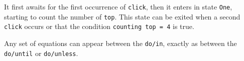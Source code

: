 \documentclass[11pt,titlepage,twoside]{report}
\begin{document}
It first awaits for the first occurrence of \verb-click-, then it
enters in state \verb-One-, starting to count the number of
\verb-top-. This state can be exited when a second
\verb-click- occurs or that the condition \verb-counting top = 4- is
true. 

Any set of equations can appear between the \texttt{do/in}, exactly as
between the \texttt{do/until} or \texttt{do/unless}.







\end{document}
